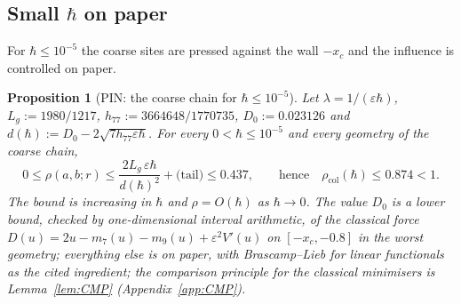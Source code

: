 \documentclass[11pt,a4paper]{article}
\newtheorem{proposition}[theorem]{Proposition}
\theoremstyle{definition}
\theoremstyle{remark}
\newcommand{\xc}{x_c}
\newcommand{\rcol}{\rho_{\mathrm{col}}}
\begin{document}
\subsection{Small \texorpdfstring{$\hbar$}{hbar} on paper}\label{sec:PIN}
For $\hbar\le10^{-5}$ the coarse sites are pressed against the wall $-\xc$ and the influence is controlled on paper.

\begin{proposition}[PIN: the coarse chain for $\hbar\le10^{-5}$]\label{prop:PIN}
Let $\lambda=1/(\varepsilon\hbar)$, $L_g:=1980/1217$, $h_{77}:=3664648/1770735$, $D_0:=0.023126$ and $d(\hbar):=D_0-2\sqrt{7h_{77}\varepsilon\hbar}$. For every $0<\hbar\le10^{-5}$ and every geometry of the coarse chain,
\[
0\le\rho(a,b;r)\le\frac{2L_g\,\varepsilon\hbar}{d(\hbar)^2}+\text{(tail)}\le0.437,\qquad\text{hence}\quad\rcol(\hbar)\le0.874<1 .
\]
The bound is increasing in $\hbar$ and $\rho=O(\hbar)$ as $\hbar\to0$. The value $D_0$ is a lower bound, checked by one-dimensional interval arithmetic, of the classical force $D(u)=2u-m_7(u)-m_9(u)+\varepsilon^2V'(u)$ on $[-\xc,-0.8]$ in the worst geometry; everything else is on paper, with Brascamp--Lieb for linear functionals as the cited ingredient; the comparison principle for the classical minimisers is Lemma~\ref{lem:CMP} (Appendix~\ref{app:CMP}).
\end{proposition}
\end{document}
